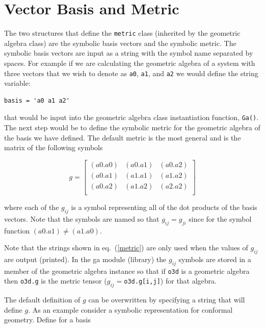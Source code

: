 \documentclass[12pt]{report}
\newcommand{\lbrk}{\left [}
\newcommand{\rbrk}{\right ]}
\newcommand{\T}[1]{\texttt{#1}}
\begin{document}
\section{Vector Basis and Metric}\label{BasisMetric}

The two structures that define the \T{metric} class (inherited by the
geometric algebra class) are the
symbolic basis vectors and the symbolic metric.  The symbolic basis
vectors are input as a string with the symbol name separated by spaces.  For
example if we are calculating the geometric algebra of a system with three
vectors that we wish to denote as \T{a0}, \T{a1}, and \T{a2} we would define the
string variable:

\begin{lstlisting}[numbers=none]
  basis = 'a0 a1 a2'
\end{lstlisting}

that would be input into the geometric algebra class instantiation function, \T{Ga()}.  The next step would be
to define the symbolic metric for the geometric algebra of the basis we
have defined. The default metric is the most general and is the matrix of
the following symbols

  \begin{equation}\label{metric}
  g = \lbrk
  \begin{array}{ccc}
    (a0.a0)   & (a0.a1)  & (a0.a2) \\
    (a0.a1) & (a1.a1)  & (a1.a2) \\
    (a0.a2) & (a1.a2) & (a2.a2) \\
  \end{array}
  \rbrk
  \end{equation}


where each of the $g_{ij}$ is a symbol representing all of the dot
products of the basis vectors. Note that the symbols are named so that
$g_{ij} = g_{ji}$ since for the symbol function
$(a0.a1) \ne (a1.a0)$.

Note that the strings shown in eq.~(\ref{metric}) are only used when the values
of $g_{ij}$ are output (printed).   In the ga module (library)
the $g_{ij}$ symbols are stored in a member of the geometric algebra
instance so that if  \T{o3d} is a geometric algebra then \T{o3d.g} is
the metric tensor ($g_{ij} = $\T{o3d.g[i,j]}) for that algebra.

The default definition of $g$ can be overwritten by specifying a string
that will define $g$. As an example consider a symbolic representation
for conformal geometry. Define for a basis
\end{document}
